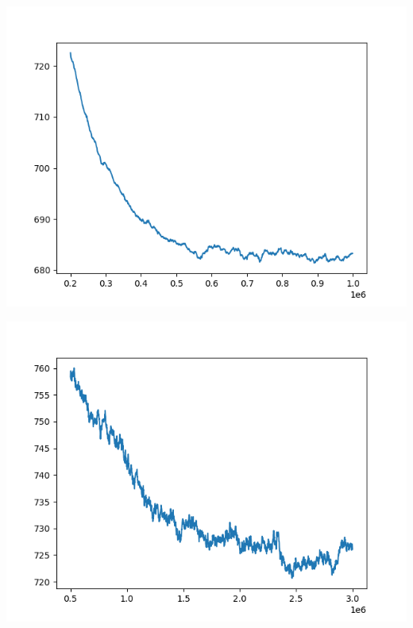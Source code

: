\documentclass{article}
\begin{document}
\begin{enumerate}[label=\arabic*.]
        \begin{minipage}{0.49\linewidth}
            \includegraphics[width=\linewidth]{../starter_code/figs/sgd_wo_k_40.png}
        \end{minipage}\hfill
        \begin{minipage}{0.49\linewidth}
            \includegraphics[width=\linewidth]{../starter_code/figs/sgd_k40.png}
        \end{minipage}\hfill
        \begin{minipage}{0.49\linewidth}

\end{minipage}
\end{enumerate}
\end{document}
